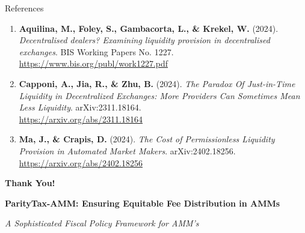 \documentclass[aspectratio=169]{beamer}
\begin{document}
\begin{frame}{References}
    \tiny
    \begin{enumerate}
        \item \textbf{Aquilina, M., Foley, S., Gambacorta, L., \& Krekel, W.} (2024). 
              \textit{Decentralised dealers? Examining liquidity provision in decentralised exchanges}. 
              BIS Working Papers No. 1227.\\
              \textcolor{parityblue}{\url{https://www.bis.org/publ/work1227.pdf}}
        
        \vspace{0.2cm}
        \item \textbf{Capponi, A., Jia, R., \& Zhu, B.} (2024). 
              \textit{The Paradox Of Just-in-Time Liquidity in Decentralized Exchanges: More Providers Can Sometimes Mean Less Liquidity}. 
              arXiv:2311.18164.\\
              \textcolor{paritygreen}{\url{https://arxiv.org/abs/2311.18164}}
        
        \vspace{0.2cm}
        \item \textbf{Ma, J., \& Crapis, D.} (2024). 
              \textit{The Cost of Permissionless Liquidity Provision in Automated Market Makers}. 
              arXiv:2402.18256.\\
              \textcolor{parityorange}{\url{https://arxiv.org/abs/2402.18256}}
    \end{enumerate}
\end{frame}

\begin{frame}
    \begin{center}
        \Huge \textcolor{parityblue}{\textbf{Thank You!}}
        
        
        \vspace{1cm}
        \normalsize
        \textbf{ParityTax-AMM: Ensuring Equitable Fee Distribution in AMMs}
        
        \vspace{0.5cm}
        \textit{A Sophisticated Fiscal Policy Framework for AMM's}
    \end{center}
\end{frame}
\end{document}
